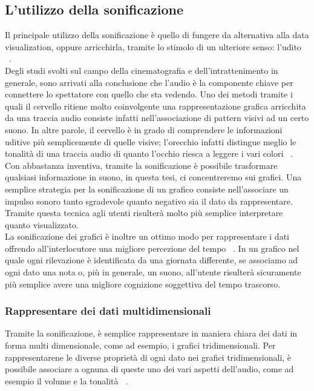\subsection{L'utilizzo della sonificazione}
Il principale utilizzo della sonificazione è quello di fungere da alternativa alla data visualization, oppure arricchirla, tramite lo stimolo di un ulteriore senso: l’udito ~\cite{soni_temporal}.
\\ 
Degli studi svolti sul campo della cinematografia e dell’intrattenimento in generale, sono arrivati alla conclusione che l’audio è la componente chiave per connettere lo spettatore con quello che sta vedendo. 
Uno dei metodi tramite i quali il cervello ritiene molto coinvolgente una rappresentazione grafica arricchita da una traccia audio consiste infatti nell’associazione di pattern visivi ad un certo suono.
In altre parole, il cervello è in grado di comprendere le informazioni uditive più semplicemente di quelle visive; l’orecchio infatti distingue meglio le tonalità di una traccia audio di quanto l’occhio riesca a leggere i vari colori ~\cite{audiovideo}.
\\
Con abbastanza inventiva, tramite la sonificazione è possibile trasformare qualsiasi informazione in suono, in questa tesi, ci concentreremo sui grafici.
Una semplice strategia per la sonificazione di un grafico consiste nell'associare un impulso sonoro tanto sgradevole quanto negativo sia il dato da rappresentare.
Tramite questa tecnica agli utenti risulterà molto più semplice interpretare quanto visualizzato.
\\ 
La sonificazione dei grafici è inoltre un ottimo modo per rappresentare i dati offrendo all’interlocutore una migliore percezione del tempo ~\cite{soni_temporal}. In un grafico nel quale ogni rilevazione è identificata da una giornata differente, 
se associamo ad ogni dato una nota o, più in generale, un suono, all’utente risulterà sicuramente più semplice avere una migliore cognizione soggettiva del tempo trascorso.
\\ 
\subsubsection{Rappresentare dei dati multidimensionali}
Tramite la sonificazione, è semplice rappresentare in maniera chiara dei dati in forma multi dimensionale, come ad esempio, i grafici tridimensionali. 
Per rappresentarene le diverse proprietà di ogni dato nei grafici tridimensionali, è possibile associare a ognuna di queste uno dei vari aspetti dell'audio, come ad esempio il volume e la tonalità ~\cite{multidimensional}.
